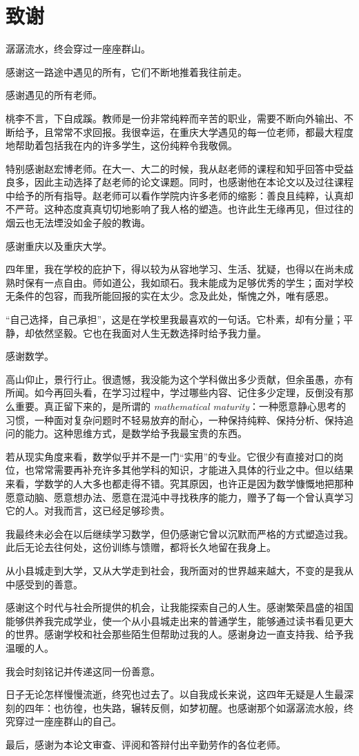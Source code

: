 \newpage
{}
\section*{致\quad 谢}

潺潺流水，终会穿过一座座群山。

感谢这一路途中遇见的所有，它们不断地推着我往前走。

感谢遇见的所有老师。

桃李不言，下自成蹊。教师是一份非常纯粹而辛苦的职业，需要不断向外输出、不断给予，且常常不求回报。我很幸运，在重庆大学遇见的每一位老师，都最大程度地帮助着包括我在内的许多学生，这份纯粹令我敬佩。

特别感谢赵宏博老师。在大一、大二的时候，我从赵老师的课程和知乎回答中受益良多，因此主动选择了赵老师的论文课题。同时，也感谢他在本论文以及过往课程中给予的所有指导。赵老师可以看作学院内许多老师的缩影：善良且纯粹，认真却不严苛。这种态度真真切切地影响了我人格的塑造。也许此生无缘再见，但过往的烟云也无法堙没如金子般的教诲。

感谢重庆以及重庆大学。

四年里，我在学校的庇护下，得以较为从容地学习、生活、犹疑，也得以在尚未成熟时保有一点自由。师如道公，我如顽石。我未能成为足够优秀的学生；面对学校无条件的包容，而我所能回报的实在太少。念及此处，惭愧之外，唯有感恩。

“自己选择，自己承担”，这是在学校里我最喜欢的一句话。它朴素，却有分量；平静，却依然坚毅。它也在我面对人生无数选择时给予我力量。

感谢数学。

高山仰止，景行行止。很遗憾，我没能为这个学科做出多少贡献，但余虽愚，亦有所闻。如今再回头看，在学习过程中，学过哪些内容、记住多少定理，反倒没有那么重要。真正留下来的，是所谓的 \emph{mathematical maturity}：一种愿意静心思考的习惯，一种面对复杂问题时不轻易放弃的耐心，一种保持纯粹、保持分析、保持追问的能力。这种思维方式，是数学给予我最宝贵的东西。

若从现实角度来看，数学似乎并不是一门“实用”的专业。它很少有直接对口的岗位，也常常需要再补充许多其他学科的知识，才能进入具体的行业之中。但以结果来看，学数学的人大多也都走得不错。究其原因，也许正是因为数学慷慨地把那种愿意动脑、愿意想办法、愿意在混沌中寻找秩序的能力，赠予了每一个曾认真学习它的人。对我而言，这已经足够珍贵。

我最终未必会在以后继续学习数学，但仍感谢它曾以沉默而严格的方式塑造过我。此后无论去往何处，这份训练与馈赠，都将长久地留在我身上。

从小县城走到大学，又从大学走到社会，我所面对的世界越来越大，不变的是我从中感受到的善意。

感谢这个时代与社会所提供的机会，让我能探索自己的人生。感谢繁荣昌盛的祖国能够供养我完成学业，使一个从小县城走出来的普通学生，能够通过读书看见更大的世界。感谢学校和社会那些陌生但帮助过我的人。感谢身边一直支持我、给予我温暖的人。

我会时刻铭记并传递这同一份善意。

日子无论怎样慢慢流逝，终究也过去了。以自我成长来说，这四年无疑是人生最深刻的四年：也彷徨，也失路，辗转反侧，如梦初醒。也感谢那个如潺潺流水般，终究穿过一座座群山的自己。

最后，感谢为本论文审查、评阅和答辩付出辛勤劳作的各位老师。
